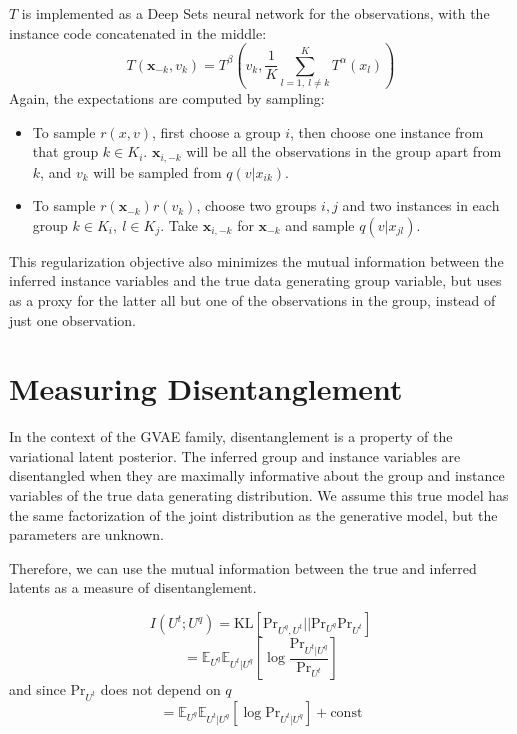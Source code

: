\documentclass[nohyperref]{article}
\theoremstyle{plain}
\theoremstyle{definition}
\theoremstyle{remark}
\begin{document}
\begin{enumerate}
\begin{align}
\begin{split}
        \end{split}
    \end{align}
    $T$ is implemented as a Deep Sets neural network for the observations, with the instance code concatenated in the middle:
    $$T(\mathbf{x}_{-k}, v_k) = T^\beta \left(v_k, \frac{1}{K} \sum_{l=1, ~ l \neq k}^K T^\alpha (x_l) \right)$$
    Again, the expectations are computed by sampling:
    \begin{itemize}
        \item To sample $r(x, v)$, first choose a group $i$, then choose one instance from that group $k \in K_i$. $\mathbf{x}_{i,-k}$ will be all the observations in the group apart from $k$, and $v_k$ will be sampled from $q(v | x_{ik})$.
        \item To sample $r(\mathbf{x}_{-k})r(v_k)$, choose two groups $i, j$ and two instances in each group $k \in K_i, ~ l \in K_j$. Take $\mathbf{x}_{i, -k}$ for $\mathbf{x}_{-k}$ and sample $q(v | x_{jl})$. 
    \end{itemize}
    
    This regularization objective also minimizes the mutual information between the inferred instance variables and the true data generating group variable, but uses as a proxy for the latter all but one of the observations in the group, instead of just one observation.
\end{enumerate}

\section{Measuring Disentanglement}

In the context of the GVAE family, disentanglement is a property of the variational latent posterior. The inferred group and instance variables are disentangled when they are maximally informative about the group and instance variables of the true data generating distribution. We assume this true model has the same factorization of the joint distribution as the generative model, but the parameters are unknown.

Therefore, we can use the mutual information between the true and inferred latents as a measure of disentanglement.

$$I(U^t; U^q) = \mathrm{KL} [\mathrm{Pr}_{U^q, U^t} || \mathrm{Pr}_{U^q} \mathrm{Pr}_{U^t}]$$
$$= \mathbb{E}_{U^q} \mathbb{E}_{U^t | U^q} \left[ \log \frac{\mathrm{Pr}_{U^t | U^q}}{\mathrm{Pr}_{U^t}} \right]$$
and since $\mathrm{Pr}_{U^t}$ does not depend on $q$
$$= \mathbb{E}_{U^q} \mathbb{E}_{U^t | U^q} [ \log \mathrm{Pr}_{U^t | U^q}] + \mathrm{const}$$
\end{document}
